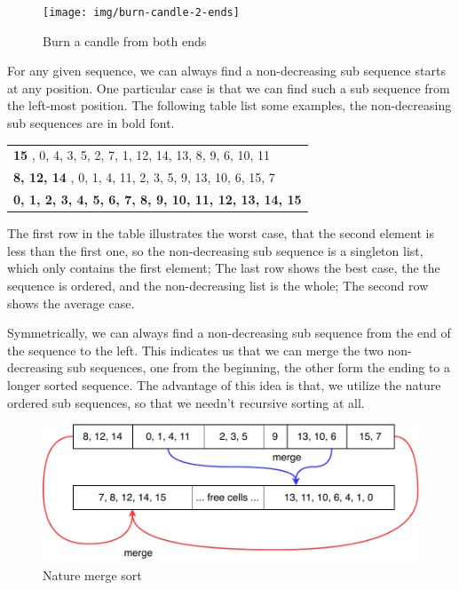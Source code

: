 \documentclass[b5paper]{article}
\begin{document}
\begin{figure}[htbp]
 \centering
 \texttt{[image: img/burn-candle-2-ends]}
 \caption{Burn a candle from both ends}
 \label{fig:burn-candle}
\end{figure}

For any given sequence, we can always find a non-decreasing sub sequence starts at any position.
One particular case is that we can find such a sub sequence from the left-most position. The following
table list some examples, the non-decreasing sub sequences are in bold font.

\begin{tabular}{ | l |}
\hline
{\bf 15 } , 0, 4, 3, 5, 2, 7, 1, 12, 14, 13, 8, 9, 6, 10, 11 \\
{\bf 8, 12, 14 }, 0, 1, 4, 11, 2, 3, 5, 9, 13, 10, 6, 15, 7 \\
{\bf 0, 1, 2, 3, 4, 5, 6, 7, 8, 9, 10, 11, 12, 13, 14, 15 } \\
\hline
\end{tabular}

The first row in the table illustrates the worst case, that the second element is less than the first one,
so the non-decreasing sub sequence is a singleton list, which only contains the first element;
The last row shows the best case, the the sequence is ordered, and the non-decreasing list is the whole;
The second row shows the average case.

Symmetrically, we can always find a non-decreasing sub sequence from the end of the sequence
to the left. This indicates us that we can merge the two non-decreasing sub sequences, one
from the beginning, the other form the ending to a longer sorted sequence. The advantage of
this idea is that, we utilize the nature ordered sub sequences, so that we needn't recursive
sorting at all.

\begin{figure}[htbp]
 \centering
 \includegraphics[scale=0.8]{img/nature-merge-sort}
 \caption{Nature merge sort}
 \label{fig:nature-merge-sort}
\end{figure}
\end{document}
